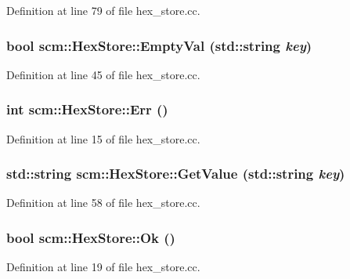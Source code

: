 Definition at line 79 of file hex\_\-store.cc.

\hypertarget{classscm_1_1_hex_store_a2c7a1fc73741e0b3613516388b562475}{
\subsubsection[{EmptyVal}]{\setlength{\rightskip}{0pt plus 5cm}bool scm::HexStore::EmptyVal (std::string {\em key})}}
\label{classscm_1_1_hex_store_a2c7a1fc73741e0b3613516388b562475}


Definition at line 45 of file hex\_\-store.cc.

\hypertarget{classscm_1_1_hex_store_a85cbfdc7f9a41355db174d3b96382d79}{
\subsubsection[{Err}]{\setlength{\rightskip}{0pt plus 5cm}int scm::HexStore::Err ()}}
\label{classscm_1_1_hex_store_a85cbfdc7f9a41355db174d3b96382d79}


Definition at line 15 of file hex\_\-store.cc.

\hypertarget{classscm_1_1_hex_store_acdc20757093a52e3f7748dea41d185b2}{
\subsubsection[{GetValue}]{\setlength{\rightskip}{0pt plus 5cm}std::string scm::HexStore::GetValue (std::string {\em key})}}
\label{classscm_1_1_hex_store_acdc20757093a52e3f7748dea41d185b2}


Definition at line 58 of file hex\_\-store.cc.

\hypertarget{classscm_1_1_hex_store_ae8d894818fe0859462b63f2e34d08a33}{
\subsubsection[{Ok}]{\setlength{\rightskip}{0pt plus 5cm}bool scm::HexStore::Ok ()}}
\label{classscm_1_1_hex_store_ae8d894818fe0859462b63f2e34d08a33}


Definition at line 19 of file hex\_\-store.cc.

